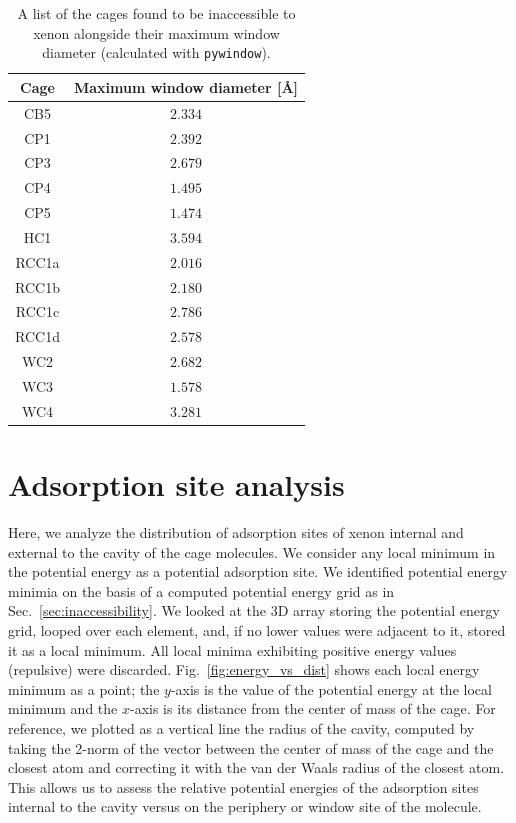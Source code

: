 \documentclass[journal=jacsat,manuscript=article]{achemso}
\begin{document}
\begin{table}
  \caption{A list of the cages found to be inaccessible to xenon alongside their maximum window diameter (calculated with \texttt{pywindow}).}
  \label{tbl:inaccessible}
  \begin{tabular}{cc}
    \hline
    \textbf{Cage}  & \textbf{Maximum window diameter [\AA]}  \\
    \hline
    CB5 & $2.334$ \\
    CP1 & $2.392$ \\
    CP3 & $2.679$ \\
    CP4 & $1.495$ \\
	CP5 & $1.474$ \\
    HC1 & $3.594$ \\
    RCC1a & $2.016$ \\
    RCC1b & $2.180$ \\
    RCC1c & $2.786$ \\
	RCC1d & $2.578$ \\
	WC2 & $2.682$ \\
	WC3 & $1.578$ \\
	WC4 & $3.281$ \\
    \hline
  \end{tabular}
\end{table}

\clearpage
\newpage


\section{Adsorption site analysis}
Here, we analyze the distribution of adsorption sites of xenon internal and external to the cavity of the cage molecules. We consider any local minimum in the potential energy as a potential adsorption site. We identified potential energy minimia on the basis of a computed potential energy grid as in Sec.~\ref{sec:inaccessibility}. We looked at the 3D array storing the potential energy grid, looped over each element, and, if no lower values were adjacent to it, stored it as a local minimum. All local minima exhibiting positive energy values (repulsive) were discarded. 
Fig.~\ref{fig:energy_vs_dist} shows each local energy minimum as a point; the $y$-axis is the value of the potential energy at the local minimum and the $x$-axis is its distance from the center of mass of the cage. For reference, we plotted as a vertical line the radius of the cavity, computed by taking the 2-norm of the vector between the center of mass of the cage and the closest atom and correcting it with the van der Waals radius of the closest atom. This allows us to assess the relative potential energies of the adsorption sites internal to the cavity versus on the periphery or window site of the molecule.
\end{document}
